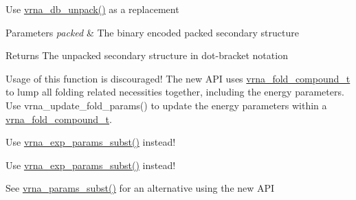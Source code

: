 \begin{DoxyRefList}
\item[\label{deprecated__deprecated000131}%
\hypertarget{deprecated__deprecated000131}{}%
Global \hyperlink{group__struct__utils_ga071c6921efe1eb974f115ee6fefa3c39}{unpack\-\_\-structure} (const char $\ast$packed)]Use \hyperlink{group__struct__utils_ga6490adff857d84ce06e6f379ae3a4512}{vrna\-\_\-db\-\_\-unpack()} as a replacement 
\begin{DoxyParams}{Parameters}
{\em packed} & The binary encoded packed secondary structure \\
\hline
\end{DoxyParams}
\begin{DoxyReturn}{Returns}
The unpacked secondary structure in dot-\/bracket notation  
\end{DoxyReturn}

\item[\label{deprecated__deprecated000025}%
\hypertarget{deprecated__deprecated000025}{}%
Global \hyperlink{group__consensus__fold_gac484c6bd429bafbd353b91044508d8e9}{update\-\_\-alifold\-\_\-params} (void)]Usage of this function is discouraged! The new A\-P\-I uses \hyperlink{group__fold__compound_ga1b0cef17fd40466cef5968eaeeff6166}{vrna\-\_\-fold\-\_\-compound\-\_\-t} to lump all folding related necessities together, including the energy parameters. Use vrna\-\_\-update\-\_\-fold\-\_\-params() to update the energy parameters within a \hyperlink{group__fold__compound_ga1b0cef17fd40466cef5968eaeeff6166}{vrna\-\_\-fold\-\_\-compound\-\_\-t}.  
\item[\label{deprecated__deprecated000117}%
\hypertarget{deprecated__deprecated000117}{}%
Global \hyperlink{part__func__co_8h_a6e0f36c1f9b7d9dd4bfbad914c1119e5}{update\-\_\-co\-\_\-pf\-\_\-params} (int length)]Use \hyperlink{group__energy__parameters_ga8e7ac4fab3b0cc03afbc134eaafb3525}{vrna\-\_\-exp\-\_\-params\-\_\-subst()} instead! 
\item[\label{deprecated__deprecated000118}%
\hypertarget{deprecated__deprecated000118}{}%
Global \hyperlink{part__func__co_8h_a75465d7e8793db68a434d83df9a2e794}{update\-\_\-co\-\_\-pf\-\_\-params\-\_\-par} (int length, vrna\-\_\-exp\-\_\-param\-\_\-t $\ast$parameters)]Use \hyperlink{group__energy__parameters_ga8e7ac4fab3b0cc03afbc134eaafb3525}{vrna\-\_\-exp\-\_\-params\-\_\-subst()} instead! 
\item[\label{deprecated__deprecated000033}%
\hypertarget{deprecated__deprecated000033}{}%
Global \hyperlink{group__mfe__cofold_ga4fcbf34e77b99bfbb2333d2ab0c41a57}{update\-\_\-cofold\-\_\-params} (void)]See \hyperlink{group__energy__parameters_ga5d1909208f7ea3baa98b75afaa1f62ca}{vrna\-\_\-params\-\_\-subst()} for an alternative using the new A\-P\-I  

\end{DoxyRefList}
